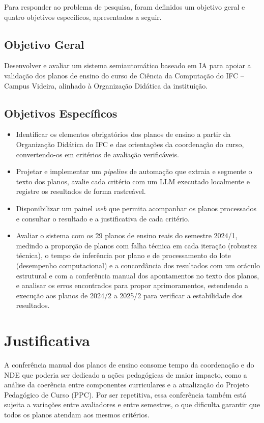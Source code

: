 Para responder ao problema de pesquisa, foram definidos um objetivo geral e quatro objetivos específicos, apresentados a seguir.

\subsection{Objetivo Geral}

Desenvolver e avaliar um sistema semiautomático baseado em IA para apoiar a validação dos planos de ensino do curso de Ciência da Computação do IFC -- Campus Videira, alinhado à Organização Didática da instituição.

\subsection{Objetivos Específicos}

\begin{itemize}
    \item Identificar os elementos obrigatórios dos planos de ensino a partir da Organização Didática do IFC e das orientações da coordenação do curso, convertendo-os em critérios de avaliação verificáveis.
    \item Projetar e implementar um \textit{pipeline} de automação que extraia e segmente o texto dos planos, avalie cada critério com um LLM executado localmente e registre os resultados de forma rastreável.
    \item Disponibilizar um painel \textit{web} que permita acompanhar os planos processados e consultar o resultado e a justificativa de cada critério.
    \item Avaliar o sistema com os 29 planos de ensino reais do semestre 2024/1, medindo a proporção de planos com falha técnica em cada iteração (robustez técnica), o tempo de inferência por plano e de processamento do lote (desempenho computacional) e a concordância dos resultados com um oráculo estrutural e com a conferência manual dos apontamentos no texto dos planos, e analisar os erros encontrados para propor aprimoramentos, estendendo a execução aos planos de 2024/2 a 2025/2 para verificar a estabilidade dos resultados.
\end{itemize}

\section{Justificativa}

A conferência manual dos planos de ensino consome tempo da coordenação e do NDE que poderia ser dedicado a ações pedagógicas de maior impacto, como a análise da coerência entre componentes curriculares e a atualização do Projeto Pedagógico de Curso (PPC). Por ser repetitiva, essa conferência também está sujeita a variações entre avaliadores e entre semestres, o que dificulta garantir que todos os planos atendam aos mesmos critérios.

